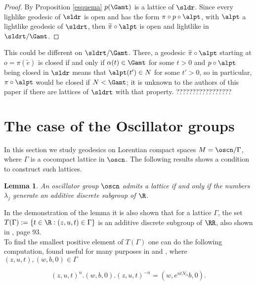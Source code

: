 \documentclass[11pt]{amsart}
\theoremstyle{plain}
\newtheorem{lem}[thm]{Lemma}
\theoremstyle{definition}
\theoremstyle{remark}
\begin{document}
\begin{proof}  By Proposition \ref{esquema} $p(\Gamt)$ is a lattice of $\sldr$. Since every lighlike geodesic of $\sldr$ is open and has the form $\pi \circ p \circ \alpt$, with $\alpt$ a lightlike geodesic of $\sldrt$, then $\widetilde{\pi} \circ \alpt$ is open and lightlike in $\sldrt/\Gamt$.
\end{proof}





This could be different on  $\sldrt/ \Gamt$. There, a geodesic $\widetilde{\pi} \circ \alpt$  starting at $o = \pi (\widetilde{e})$ is closed if and only if $\alpha(t) \in \Gamt$ for some $t>0$ and $p \circ \alpt$ being closed in $\sldr$ means that $\alpt(t') \in N$ for some $t'>0$, so in particular, $\pi \circ \alpt$ would be closed if $N < \Gamt$; it is unknown to the authors of this paper if there are lattices of $\sldrt$ with that property. ?????????????????


\section{The case of the Oscillator groups}\label{sectionosc}

In this section we study geodesics on Lorentian compact spaces $M=\oscn/ \Gamma$, where $\Gamma$ is a cocompact lattice in $\oscn$. The following results shows a condition to construct such lattices. 


\begin{lem}\cite{MeRe}\label{lema_medina}
	An oscillator group $\oscn$ admits a lattice if and only if the numbers $\lambda_j$ generate an additive discrete subgroup of $\R$.
\end{lem}

In the demonstration of the lemma it is also shown that for a lattice $\Gamma$, the set $T(\Gamma):=\{ t \in \R : (z,u,t) \in \Gamma \}$ is an additive discrete subgroup of $\RR$, also shown in \cite{MF}, page 93.\\

To find the smallest positive element of $T(\Gamma)$ one can do the following computation, found useful for many purposes in \cite{MeRe} and \cite{MF}, where $(z,u,t), (w,b,0) \in \Gamma$

\begin{equation*}
    (z,u,t)^n.(w,b,0).(z,u,t)^{-n}=(w,e^{n t N_{\lambda}}b,0).
\end{equation*}
\end{document}
